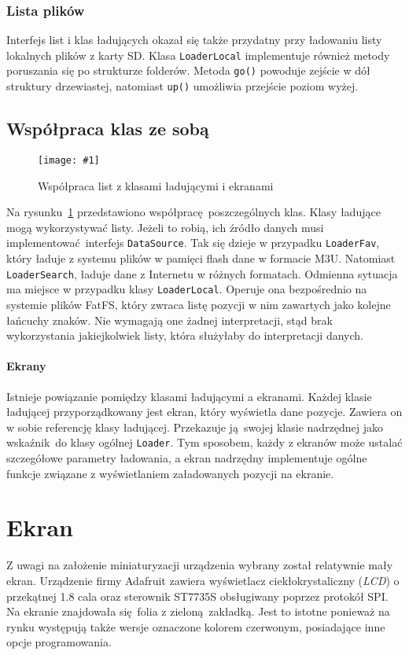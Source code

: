 \documentclass[12pt]{report}
\newcommand{\imgint}[4]{
	\begin{figure}[{#4}]
		\centering
		\texttt{[image: \#1]}
		\caption{#2}
		\label{#1}
	\end{figure}
}
\newcommand{\imgh}[3]{\imgint{#1}{#2}{#3}{H}}
\begin{document}
			\subsubsection{Lista plików}
				Interfejs list i klas ładujących okazał się także przydatny przy ładowaniu listy lokalnych plików z karty SD. Klasa \lstinline|LoaderLocal| implementuje również metody poruszania się po strukturze folderów. Metoda \lstinline|go()| powoduje zejście w dół struktury drzewiastej, natomiast \lstinline|up()| umożliwia przejście poziom wyżej.

		\subsection{Współpraca klas ze sobą}
			\imgh{3/PicoRadio-loaders}{Współpraca list z klasami ładującymi i ekranami}{0.8}
			Na rysunku~\ref{3/PicoRadio-loaders} przedstawiono współpracę poszczególnych klas. Klasy ładujące mogą wykorzystywać listy. Jeżeli to robią, ich źródło danych musi implementować interfejs \lstinline|DataSource|. Tak się dzieje w przypadku \lstinline|LoaderFav|, który ładuje z systemu plików w pamięci flash dane w formacie M3U. Natomiast \lstinline|LoaderSearch|, ładuje dane z Internetu w różnych formatach. Odmienna sytuacja ma miejsce w przypadku klasy \lstinline|LoaderLocal|. Operuje ona bezpośrednio na systemie plików FatFS, który zwraca listę pozycji w nim zawartych jako kolejne łańcuchy znaków. Nie wymagają one żadnej interpretacji, stąd brak wykorzystania jakiejkolwiek listy, która służyłaby do interpretacji danych.
			
			\paragraph{Ekrany}
				Istnieje powiązanie pomiędzy klasami ładującymi a ekranami. Każdej klasie ładującej przyporządkowany jest ekran, który wyświetla dane pozycje. Zawiera on w sobie referencję klasy ładującej. Przekazuje ją swojej klasie nadrzędnej jako wskaźnik do klasy ogólnej \lstinline|Loader|. Tym sposobem, każdy z ekranów może ustalać szczegółowe parametry ładowania, a ekran nadrzędny implementuje ogólne funkcje związane z wyświetlaniem załadowanych pozycji na ekranie.
	
	\section{Ekran}
		Z uwagi na założenie miniaturyzacji urządzenia wybrany został relatywnie mały ekran. Urządzenie firmy Adafruit zawiera wyświetlacz ciekłokrystaliczny (\textit{LCD}) o przekątnej 1.8 cala oraz sterownik ST7735S obsługiwany poprzez protokół SPI. Na ekranie znajdowała się folia z zieloną zakładką. Jest to istotne ponieważ na rynku występują także wersje oznaczone kolorem czerwonym, posiadające inne opcje programowania.
		$ $\\
		
\end{document}
